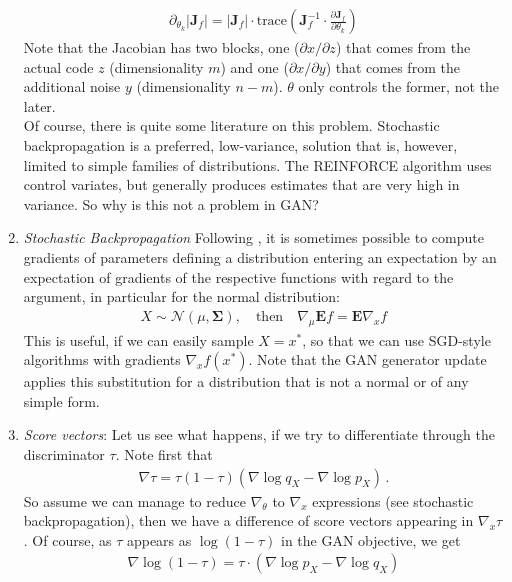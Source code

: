 \documentclass{article}
\newcommand{\J}{{\mathbf J}}
\newcommand{\E}{{\mathbf E}}
\begin{document}
\begin{enumerate}
\begin{align}
\partial_{\theta_k} |\J_f| =  |\J_f| \cdot \text{trace}\left(  \J_f^{-1} \cdot \frac{\partial \J_f}{\partial \theta_k} \right) 
\end{align}
Note that the Jacobian has two blocks, one ($\partial x / \partial z$) that comes from the actual code $z$ (dimensionality $m$) and one ($\partial x / \partial y$) that comes from the additional noise $y$ (dimensionality $n-m$). $\theta$ only controls the former, not the later. \\
Of course, there is quite some literature on this problem. Stochastic backpropagation is a preferred, low-variance, solution that is, however, limited to simple families of distributions. The REINFORCE algorithm uses control variates, but generally produces estimates that are very high in variance. So why is this not a problem in GAN?
%
\item \textit{Stochastic Backpropagation} 
%
Following \cite{kingma2013auto,rezende2014stochastic}, it is sometimes possible to compute gradients of parameters defining a distribution entering an expectation by an expectation of gradients of the respective functions  with regard to the argument, in particular for the normal distribution:
\begin{align}
X \sim \mathcal N(\mu, \mathbf \Sigma), \quad \text{then} \quad \nabla_\mu \E f = \E \nabla_x  f 
\end{align}
This is useful, if we can easily sample $X=x^*$, so that we can use SGD-style algorithms with gradients $ \nabla_x f(x^*)$. Note that the GAN generator update applies this substitution for a distribution that is not a normal or of any simple form. 
%
\item \textit{Score vectors}: 
%
Let us see what happens, if we try to differentiate through the discriminator $\tau$. Note first that 
\begin{align}
\nabla \tau = \tau (1-\tau) \left( \nabla \log q_X - \nabla \log p_X \right)  \,.
\end{align}
So assume we can manage to reduce $\nabla_\theta$ to $\nabla_x$ expressions (see stochastic backpropagation), then we have a difference of score vectors appearing in $\nabla_x \tau$. Of course, as $\tau$ appears as $\log (1-\tau)$ in the GAN objective, we get 
\begin{align}
\nabla \log (1-\tau) = \tau \cdot \left( \nabla \log p_X - \nabla \log q_X \right) 
\end{align} 

\end{enumerate}
\end{document}
